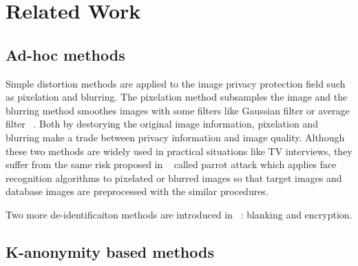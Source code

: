 \chapter{Related Work}

\section{Ad-hoc methods}
	Simple distortion methods are applied to the image privacy protection field such as pixelation and blurring. The pixelation method subsamples the image and the blurring method smoothes images with some filters like Gaussian filter or average filter ~\cite{Agrawal09,Boyle00}. Both by destorying the original image information, pixelation and blurring make a trade between privacy information and image quality. Although these two methods are widely used in practical situations like TV interviews, they suffer from the same risk proposed in ~\cite{Newton05} called parrot attack which applies face recognition algorithms to pixelated or blurred images so that target images and database images are preprocessed with the similar procedures. 

	Two more de-identificaiton methods are introduced in ~\cite{Winkler14}: blanking and encryption. 
\section{K-anonymity based methods}
